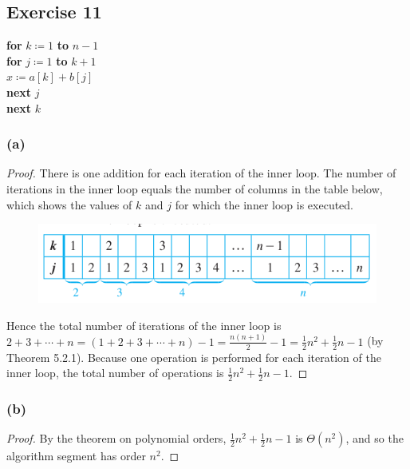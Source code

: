 \documentclass[14pt]{extarticle}
\begin{document}
\subsection{Exercise 11}
\begin{tabbing}
    {\bf for} \= \(k \coloneqq 1\) {\bf to} \(n-1\) \\
    \> {\bf for} \= \(j \coloneqq 1\) {\bf to} \(k+1\)\\
    \>           \> \(x \coloneqq a[k] + b[j]\) \\
    \> {\bf next} \(j\) \\
    {\bf next} \(k\)
\end{tabbing}

\subsubsection{(a)}
\begin{proof}
    There is one addition for each iteration of the inner loop. The number of iterations in the inner loop equals the number
    of columns in the table below, which shows the values of \(k\) and \(j\) for which the inner loop is executed.

    \begin{figure}[ht!]
        \centering
        \includegraphics[scale=0.5]{../images/11.3.11.a.png}
    \end{figure}

    Hence the total number of iterations of the inner loop is \(2+3+\cdots+n = (1+2+3+\cdots+n) - 1 = \frac{n(n+1)}{2} - 1 =
    \frac{1}{2}n^2 + \frac{1}{2}n - 1\) (by Theorem 5.2.1). Because one operation is performed for each iteration of the
    inner loop, the total number of operations is \(\frac{1}{2}n^2 + \frac{1}{2}n - 1\).
\end{proof}

\subsubsection{(b)}
\begin{proof}
    By the theorem on polynomial orders, \(\frac{1}{2}n^2 + \frac{1}{2}n - 1\) is \(\Theta(n^2)\), and so the algorithm
    segment has order \(n^2\).
\end{proof}
\end{document}
